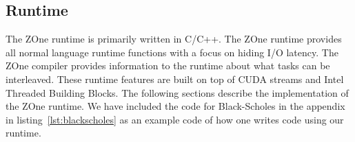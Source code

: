 
\subsection{Runtime}
The ZOne runtime is primarily written in C/C++. The ZOne runtime provides all
normal language runtime functions with a focus on hiding I/O latency. The ZOne
compiler provides information to the runtime about what tasks can be
interleaved. These runtime features are built on top of CUDA streams and 
Intel Threaded Building Blocks. The following sections describe the
implementation of the ZOne runtime.
We have included the code for Black-Scholes in the appendix in listing~\ref{lst:blackscholes} as an example code of how one writes code using our runtime.




